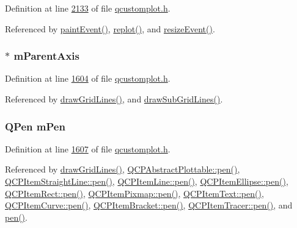 Definition at line \hyperlink{a00116_source_l02133}{2133} of file \hyperlink{a00116_source}{qcustomplot.\+h}.



Referenced by \hyperlink{a00115_source_l07512}{paint\+Event()}, \hyperlink{a00115_source_l07221}{replot()}, and \hyperlink{a00115_source_l07525}{resize\+Event()}.

\hypertarget{a00116_aea80007cf54320e192a69054cd81504b}{
\subsubsection[{m\+Parent\+Axis}]{$\ast$ m\+Parent\+Axis}}\label{a00116_aea80007cf54320e192a69054cd81504b}


Definition at line \hyperlink{a00116_source_l01604}{1604} of file \hyperlink{a00116_source}{qcustomplot.\+h}.



Referenced by \hyperlink{a00115_source_l14260}{draw\+Grid\+Lines()}, and \hyperlink{a00115_source_l14331}{draw\+Sub\+Grid\+Lines()}.

\hypertarget{a00116_abcb7df1a54826856cb8f0e0ef696873b}{
\subsubsection[{m\+Pen}]{\setlength{\rightskip}{0pt plus 5cm}Q\+Pen m\+Pen}}\label{a00116_abcb7df1a54826856cb8f0e0ef696873b}


Definition at line \hyperlink{a00116_source_l01607}{1607} of file \hyperlink{a00116_source}{qcustomplot.\+h}.



Referenced by \hyperlink{a00115_source_l14260}{draw\+Grid\+Lines()}, \hyperlink{a00116_source_l00371}{Q\+C\+P\+Abstract\+Plottable\+::pen()}, \hyperlink{a00116_source_l00910}{Q\+C\+P\+Item\+Straight\+Line\+::pen()}, \hyperlink{a00116_source_l00942}{Q\+C\+P\+Item\+Line\+::pen()}, \hyperlink{a00116_source_l00978}{Q\+C\+P\+Item\+Ellipse\+::pen()}, \hyperlink{a00116_source_l01024}{Q\+C\+P\+Item\+Rect\+::pen()}, \hyperlink{a00116_source_l01071}{Q\+C\+P\+Item\+Pixmap\+::pen()}, \hyperlink{a00116_source_l01119}{Q\+C\+P\+Item\+Text\+::pen()}, \hyperlink{a00116_source_l01190}{Q\+C\+P\+Item\+Curve\+::pen()}, \hyperlink{a00116_source_l01233}{Q\+C\+P\+Item\+Bracket\+::pen()}, \hyperlink{a00116_source_l01285}{Q\+C\+P\+Item\+Tracer\+::pen()}, and \hyperlink{a00116_source_l01591}{pen()}.

